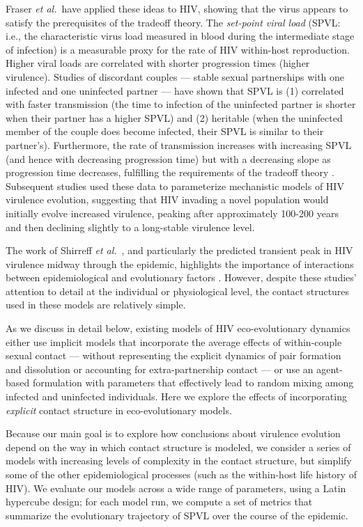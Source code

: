 \documentclass[10pt,letterpaper]{article}
\newcommand{\etal}{\textit{et al.}}
\begin{document}
Fraser \etal\ have applied these ideas to HIV,
showing that the virus appears to satisfy the prerequisites of
the tradeoff theory.
The \emph{set-point viral load} (SPVL: i.e., the
characteristic virus load measured in blood during the intermediate
stage of infection) is a measurable proxy for the rate of HIV within-host
reproduction. Higher viral loads are correlated with 
shorter progression times (higher virulence).
Studies of discordant couples --- stable
sexual partnerships with one infected and one uninfected partner --- %
have shown that SPVL is (1) correlated with faster transmission
(the time to infection of the uninfected partner is shorter when
their partner has a higher SPVL) and (2) heritable
(when the uninfected member of
the couple does become infected, their SPVL is similar to their
partner's).
Furthermore, the rate of transmission increases with
increasing SPVL (and hence with decreasing progression time)
but with a decreasing slope as progression time decreases,
fulfilling the requirements of the tradeoff theory
 \cite{Fraser+2007}.
Subsequent studies
\cite{shirreff_transmission_2011,herbeck_hiv_2014,herbeck_evolution_2016} used these data to
parameterize mechanistic models of HIV virulence evolution, suggesting
that HIV invading a novel population would initially evolve increased
virulence, peaking after approximately 100-200 years and then declining
slightly to a long-stable virulence level.

The work of Shirreff \etal\ \cite{shirreff_transmission_2011}, and particularly the predicted transient peak in HIV virulence midway through the epidemic,
highlights the importance of interactions between epidemiological and
evolutionary factors \cite{day_virulence_2004,alizon_price_2009}.
However, despite these studies' attention to detail at the individual
or physiological level, the contact structures used in these
models are relatively simple.

As we discuss in detail below,
existing models of HIV eco-evolutionary dynamics either use implicit
models that incorporate the average effects of within-couple sexual
contact --- without representing the explicit dynamics of pair
formation and dissolution or accounting for extra-partnership contact %
--- or use an agent-based formulation with parameters that effectively
lead to random mixing among infected and uninfected individuals. Here
we explore the effects of incorporating \emph{explicit}
contact structure in eco-evolutionary models.

Because our main goal is to explore how conclusions about virulence
evolution depend on the way in which contact structure
is modeled, we consider a series of
models with increasing levels of complexity in the contact
structure, but simplify some of the other epidemiological
processes (such as the within-host life history of HIV). 
We evaluate our models
across a wide range of parameters, using a Latin hypercube design; for
each model run, we compute a set of metrics 
that summarize the evolutionary trajectory of SPVL
over the course of the epidemic.
\end{document}
